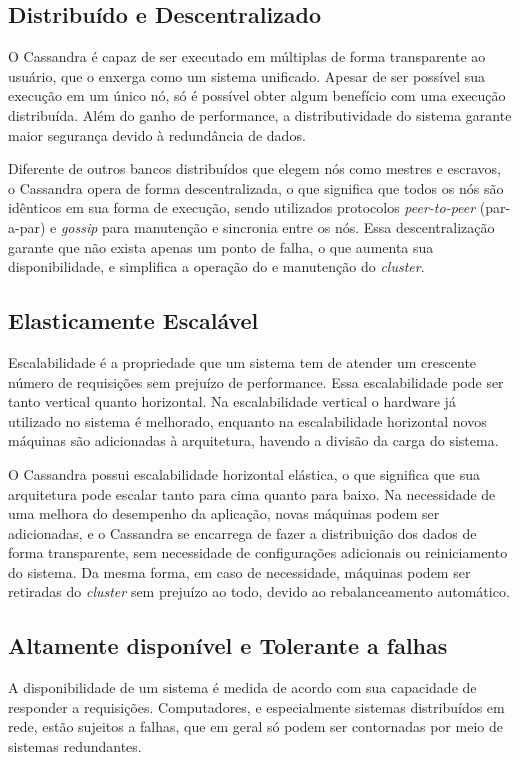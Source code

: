 \subsection*{Distribuído e Descentralizado}
O Cassandra é capaz de ser executado em múltiplas de forma transparente ao usuário, que o enxerga como um sistema unificado. Apesar de ser possível sua execução em um único nó, só é possível obter algum benefício com uma execução distribuída. Além do ganho de performance, a distributividade do sistema garante maior segurança devido à redundância de dados.

Diferente de outros bancos distribuídos que elegem nós como mestres e escravos, o Cassandra opera de forma descentralizada, o que significa que todos os nós são idênticos em sua forma de execução, sendo utilizados protocolos \emph{peer-to-peer} (par-a-par) e \emph{gossip} para manutenção e sincronia entre os nós. Essa descentralização garante que não exista apenas um ponto de falha, o que aumenta sua disponibilidade, e simplifica a operação do e manutenção do \emph{cluster}.

\subsection*{Elasticamente Escalável}
Escalabilidade é a propriedade que um sistema tem de atender um crescente número de requisições sem prejuízo de performance. Essa escalabilidade pode ser tanto vertical quanto horizontal. Na escalabilidade vertical o hardware já utilizado no sistema é melhorado, enquanto na escalabilidade horizontal novos máquinas são adicionadas à arquitetura, havendo a divisão da carga do sistema.

O Cassandra possui escalabilidade horizontal elástica, o que significa que sua arquitetura pode escalar tanto para cima quanto para baixo. Na necessidade de uma melhora do desempenho da aplicação, novas máquinas podem ser adicionadas, e o Cassandra se encarrega de fazer a distribuição dos dados de forma transparente, sem necessidade de configurações adicionais ou reiniciamento do sistema. Da mesma forma, em caso de necessidade, máquinas podem ser retiradas do \emph{cluster} sem prejuízo ao todo, devido ao rebalanceamento automático.

\subsection*{Altamente disponível e Tolerante a falhas}
A disponibilidade de um sistema é medida de acordo com sua capacidade de responder a requisições. Computadores, e especialmente sistemas distribuídos em rede, estão sujeitos a falhas, que em geral só podem ser contornadas por meio de sistemas redundantes.

